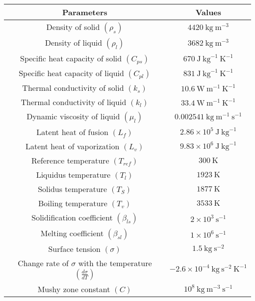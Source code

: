 \documentclass[10pt]{article}
\begin{document}
\begin{center}
\begin{tabular}{|c|c|}
\hline
Parameters & Values \\
\hline
Density of solid $\left(\rho_{s}\right)$ & $4420 \mathrm{~kg} \mathrm{~m}^{-3}$ \\
\hline
Density of liquid $\left(\rho_{l}\right)$ & $3682 \mathrm{~kg} \mathrm{~m}^{-3}$ \\
\hline
Specific heat capacity of solid $\left(C_{p s}\right)$ & $670 \mathrm{~J} \mathrm{~kg}^{-1} \mathrm{~K}^{-1}$ \\
\hline
Specific heat capacity of liquid $\left(C_{p l}\right)$ & $831 \mathrm{~J} \mathrm{~kg}^{-1} \mathrm{~K}^{-1}$ \\
\hline
Thermal conductivity of solid $\left(k_{s}\right)$ & $10.6 \mathrm{~W} \mathrm{~m}^{-1} \mathrm{~K}^{-1}$ \\
\hline
Thermal conductivity of liquid $\left(k_{l}\right)$ & $33.4 \mathrm{~W} \mathrm{~m}^{-1} \mathrm{~K}^{-1}$ \\
\hline
Dynamic viscosity of liquid $\left(\mu_{l}\right)$ & $0.002541 \mathrm{~kg} \mathrm{~m}^{-1} \mathrm{~s}^{-1}$ \\
\hline
Latent heat of fusion $\left(L_{f}\right)$ & $2.86 \times 10^{5} \mathrm{~J} \mathrm{~kg}^{-1}$ \\
\hline
Latent heat of vaporization $\left(L_{v}\right)$ & $9.83 \times 10^{6} \mathrm{~J} \mathrm{~kg}^{-1}$ \\
\hline
Reference temperature $\left(T_{r e f}\right)$ & $300 \mathrm{~K}$ \\
\hline
Liquidus temperature $\left(T_{l}\right)$ & $1923 \mathrm{~K}$ \\
\hline
Solidus temperature $\left(T_{S}\right)$ & $1877 \mathrm{~K}$ \\
\hline
Boiling temperature $\left(T_{v}\right)$ & $3533 \mathrm{~K}$ \\
\hline
Solidification coefficient $\left(\beta_{l s}\right)$ & $2 \times 10^{3} \mathrm{~s}^{-1}$ \\
\hline
Melting coefficient $\left(\beta_{s l}\right)$ & $1 \times 10^{6} \mathrm{~s}^{-1}$ \\
\hline
Surface tension $(\sigma)$ & $1.5 \mathrm{~kg} \mathrm{~s}^{-2}$ \\
\hline
Change rate of $\sigma$ with the temperature $\left(\frac{d \sigma}{d T}\right)$ & $-2.6 \times 10^{-4} \mathrm{~kg} \mathrm{~s}^{-2} \mathrm{~K}^{-1}$ \\
\hline
Mushy zone constant $(C)$ & $10^{8} \mathrm{~kg} \mathrm{~m}^{-3} \mathrm{~s}^{-1}$ \\

\end{tabular}
\end{center}
\end{document}
